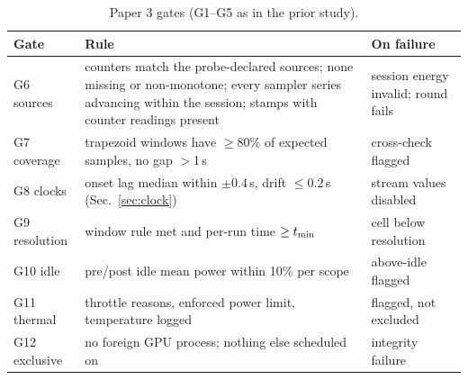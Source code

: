 \documentclass[sigconf]{acmart}
\begin{document}
\begin{table}[t]
\caption{Paper 3 gates (G1--G5 as in the prior study).}
\label{tab:gates}
\footnotesize
\setlength{\tabcolsep}{3pt}
\begin{tabular}{@{}R{0.12\textwidth}R{0.62\textwidth}R{0.22\textwidth}@{}}
\toprule
Gate & Rule & On failure \\
\midrule
G6 sources & counters match the probe-declared sources; none missing or non-monotone; every sampler series advancing within the session; stamps with counter readings present & session energy invalid; round fails \\
G7 coverage & trapezoid windows have $\ge$80\% of expected samples, no gap $>$1\,s & cross-check flagged \\
G8 clocks & onset lag median within $\pm$0.4\,s, drift $\le$0.2\,s (Sec.~\ref{sec:clock}) & stream values disabled \\
G9 resolution & window rule met and per-run time $\ge t_{\min}$ & cell below resolution \\
G10 idle & pre/post idle mean power within 10\% per scope & above-idle flagged \\
G11 thermal & throttle reasons, enforced power limit, temperature logged & flagged, not excluded \\
G12 exclusive & no foreign GPU process; nothing else scheduled on \CG{} & integrity failure \\
\bottomrule
\end{tabular}
\end{table}
\end{document}
